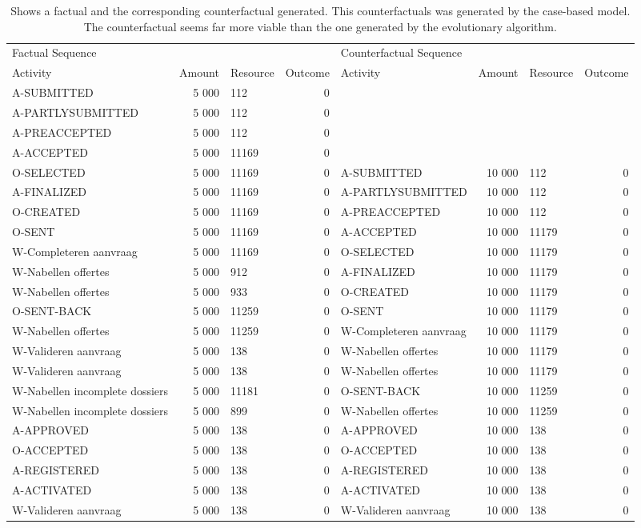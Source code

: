 \begin{table}
\caption{Shows a factual and the corresponding counterfactual generated. This counterfactuals was generated by the case-based model. The counterfactual seems far more viable than the one generated by the evolutionary algorithm.}
\label{tbl:example-cf-cbg}
\begin{tabular}{lrlrlrlr}
\toprule
\multicolumn{4}{l}{Factual Sequence} & \multicolumn{4}{l}{Counterfactual Sequence} \\
Activity & Amount & Resource & Outcome & Activity & Amount & Resource & Outcome \\
\midrule
A-SUBMITTED & 5 000 & 112 & 0 &  &  &  &  \\
A-PARTLYSUBMITTED & 5 000 & 112 & 0 &  &  &  &  \\
A-PREACCEPTED & 5 000 & 112 & 0 &  &  &  &  \\
A-ACCEPTED & 5 000 & 11169 & 0 &  &  &  &  \\
O-SELECTED & 5 000 & 11169 & 0 & A-SUBMITTED & 10 000 & 112 & 0 \\
A-FINALIZED & 5 000 & 11169 & 0 & A-PARTLYSUBMITTED & 10 000 & 112 & 0 \\
O-CREATED & 5 000 & 11169 & 0 & A-PREACCEPTED & 10 000 & 112 & 0 \\
O-SENT & 5 000 & 11169 & 0 & A-ACCEPTED & 10 000 & 11179 & 0 \\
W-Completeren aanvraag & 5 000 & 11169 & 0 & O-SELECTED & 10 000 & 11179 & 0 \\
W-Nabellen offertes & 5 000 & 912 & 0 & A-FINALIZED & 10 000 & 11179 & 0 \\
W-Nabellen offertes & 5 000 & 933 & 0 & O-CREATED & 10 000 & 11179 & 0 \\
O-SENT-BACK & 5 000 & 11259 & 0 & O-SENT & 10 000 & 11179 & 0 \\
W-Nabellen offertes & 5 000 & 11259 & 0 & W-Completeren aanvraag & 10 000 & 11179 & 0 \\
W-Valideren aanvraag & 5 000 & 138 & 0 & W-Nabellen offertes & 10 000 & 11179 & 0 \\
W-Valideren aanvraag & 5 000 & 138 & 0 & W-Nabellen offertes & 10 000 & 11179 & 0 \\
W-Nabellen incomplete dossiers & 5 000 & 11181 & 0 & O-SENT-BACK & 10 000 & 11259 & 0 \\
W-Nabellen incomplete dossiers & 5 000 & 899 & 0 & W-Nabellen offertes & 10 000 & 11259 & 0 \\
A-APPROVED & 5 000 & 138 & 0 & A-APPROVED & 10 000 & 138 & 0 \\
O-ACCEPTED & 5 000 & 138 & 0 & O-ACCEPTED & 10 000 & 138 & 0 \\
A-REGISTERED & 5 000 & 138 & 0 & A-REGISTERED & 10 000 & 138 & 0 \\
A-ACTIVATED & 5 000 & 138 & 0 & A-ACTIVATED & 10 000 & 138 & 0 \\
W-Valideren aanvraag & 5 000 & 138 & 0 & W-Valideren aanvraag & 10 000 & 138 & 0 \\
\bottomrule
\end{tabular}
\end{table}
